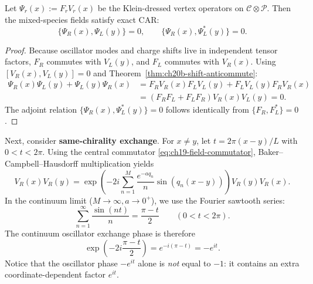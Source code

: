 \begin{theorem}
\label{thm:ch20b-mixed-car}
Let $\Psi_r(x) := F_r V_r(x)$ be the Klein-dressed vertex operators on
$\mathcal C \otimes \mathcal P$.  Then the mixed-species fields satisfy exact CAR:
\begin{equation}
 \{\Psi_R(x), \Psi_L(y)\} = 0, \qquad \{\Psi_R(x), \Psi_L^*(y)\} = 0.
 \label{eq:ch20b-mixed-car}
\end{equation}
\end{theorem}
\begin{proof}
Because oscillator modes and charge shifts live in independent tensor factors,
$F_R$ commutes with $V_L(y)$, and $F_L$ commutes with $V_R(x)$.  Using
$[V_R(x), V_L(y)] = 0$ and Theorem~\ref{thm:ch20b-shift-anticommute}:
\begin{align*}
 \Psi_R(x) \Psi_L(y) + \Psi_L(y) \Psi_R(x)
  &= F_R V_R(x) F_L V_L(y) + F_L V_L(y) F_R V_R(x) \\
  &= (F_R F_L + F_L F_R) V_R(x) V_L(y) = 0.
\end{align*}
The adjoint relation $\{\Psi_R(x), \Psi_L^*(y)\} = 0$ follows identically from $\{F_R, F_L^*\} = 0$.
\end{proof}

Next, consider \textbf{same-chirality exchange}.
For $x \ne y$, let $t = 2\pi(x-y)/L$ with $0 < t < 2\pi$.
Using the central commutator \eqref{eq:ch19-field-commutator}, Baker--Campbell--Hausdorff
multiplication yields
\begin{equation}
 V_R(x) V_R(y) = \exp\left( -2i \sum_{n=1}^M \frac{e^{-a q_n}}{n} \sin(q_n(x-y)) \right) V_R(y) V_R(x).
 \label{eq:ch20b-finite-osc-phase}
\end{equation}
In the continuum limit ($M \to \infty, a \to 0^+$), we use the Fourier sawtooth series:
\begin{equation}
 \sum_{n=1}^\infty \frac{\sin(n t)}{n} = \frac{\pi - t}{2} \qquad (0 < t < 2\pi).
 \label{eq:ch20b-sawtooth}
\end{equation}
The continuum oscillator exchange phase is therefore
\[
 \exp\left( -2i \frac{\pi - t}{2} \right) = e^{-i(\pi - t)} = -e^{it}.
\]
Notice that the oscillator phase $-e^{it}$ alone is \emph{not} equal to $-1$: it contains
an extra coordinate-dependent factor $e^{it}$.

